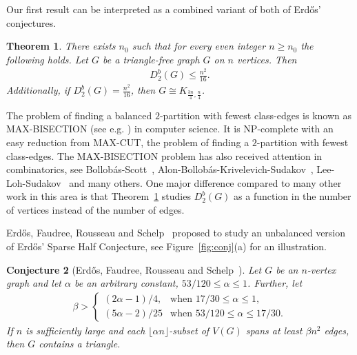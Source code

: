 \documentclass[11pt]{article}
\newtheorem{theo}{Theorem}
\newtheorem{conj}[theo]{Conjecture}
\theoremstyle{definition}
\numberwithin{theo}{section}
\begin{document}
Our first result can be interpreted as a combined variant of both of Erd\H{o}s' conjectures. 
\begin{theo}
\label{theo:balancedcut}
There exists $n_0$ such that for every even integer $n\geq n_0$ the following holds. Let $G$ be a triangle-free graph $G$ on $n$ vertices. Then
\begin{align*}
    D_2^b(G)\leq \frac{n^2}{16}.
\end{align*}
Additionally, if $D_2^b(G)=\frac{n^2}{16}$, then $G\cong K_{\frac{3n}{4},\frac{n}{4}}$. 
\end{theo}
The problem of finding a balanced $2$-partition with fewest class-edges is known as MAX-BISECTION (see e.g. \cite{MR1367967,MR2228942}) in computer science. It is NP-complete with an easy reduction from MAX-CUT, the problem of finding a $2$-partition with fewest class-edges. The MAX-BISECTION problem has also received attention in combinatorics, see Bollob\'{a}s-Scott~\cite{MR1945378}, Alon-Bollob\'{a}s-Kri\-ve\-le\-vich-Sudakov~\cite{MR1983363}, Lee-Loh-Sudakov~\cite{MR3096334} and many others. One major difference compared to many other work in this area is that Theorem~\ref{theo:balancedcut} studies $D_2^b(G)$ as a function in the number of vertices instead of the number of edges. 


Erd\H{o}s, Faudree, Rousseau and Schelp~\cite{MR1273598} proposed to study an unbalanced version of Erd\H{o}s' Sparse Half Conjecture, see Figure~\ref{fig:conj}(a) for an illustration.
\begin{conj}[Erd\H{o}s, Faudree, Rousseau and Schelp~\cite{MR1273598}]
\label{unbalconj2}
Let $G$ be an $n$-vertex graph and let $\alpha$ be an arbitrary constant, $53/120\leq \alpha\leq 1$. Further, let 
\begin{align*}
    \beta>\begin{cases} (2\alpha-1)/4, & \text{when } 17/30\leq \alpha\leq 1, \\
    (5\alpha-2)/25 & \text{when } 53/120\leq \alpha\leq 17/30. 
    \end{cases}
\end{align*}
If $n$ is sufficiently large and each $\lfloor \alpha n\rfloor$-subset of $V(G)$ spans at least $\beta n^2$ edges, then $G$ contains a triangle. 
\end{conj}
\end{document}
